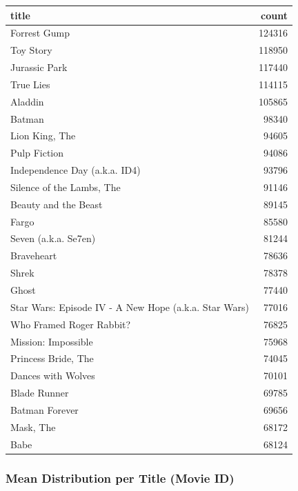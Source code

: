 \documentclass[
]{article}
\begin{document}
\begin{table}
\centering\begingroup\fontsize{10}{12}\selectfont

\begin{tabular}{l|r}
\hline
title & count\\
\hline
Forrest Gump & 124316\\
\hline
Toy Story & 118950\\
\hline
Jurassic Park & 117440\\
\hline
True Lies & 114115\\
\hline
Aladdin & 105865\\
\hline
Batman & 98340\\
\hline
Lion King, The & 94605\\
\hline
Pulp Fiction & 94086\\
\hline
Independence Day (a.k.a. ID4) & 93796\\
\hline
Silence of the Lambs, The & 91146\\
\hline
Beauty and the Beast & 89145\\
\hline
Fargo & 85580\\
\hline
Seven (a.k.a. Se7en) & 81244\\
\hline
Braveheart & 78636\\
\hline
Shrek & 78378\\
\hline
Ghost & 77440\\
\hline
Star Wars: Episode IV - A New Hope (a.k.a. Star Wars) & 77016\\
\hline
Who Framed Roger Rabbit? & 76825\\
\hline
Mission: Impossible & 75968\\
\hline
Princess Bride, The & 74045\\
\hline
Dances with Wolves & 70101\\
\hline
Blade Runner & 69785\\
\hline
Batman Forever & 69656\\
\hline
Mask, The & 68172\\
\hline
Babe & 68124\\
\hline
\end{tabular}
\endgroup{}
\end{table}

\hypertarget{mean-distribution-per-title-movie-id}{%
\subsubsection{Mean Distribution per Title (Movie
ID)}\label{mean-distribution-per-title-movie-id}}
\end{document}
